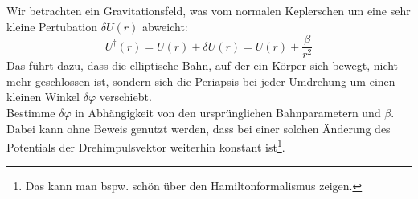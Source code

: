 \begin{Exercise}[label = phshift, title = Periheldrehung, difficulty = 5, origin = Aaron Wild]
	Wir betrachten ein Gravitationsfeld, was vom normalen Keplerschen um eine sehr kleine Pertubation $\delta U\left(r\right)$ abweicht:
	\begin{equation}\label{phshift:pot}
		U^\dagger\left(r\right) = U\left(r\right) + \delta U\left(r\right) = U\left(r\right)+\frac{\beta}{r^2}
	\end{equation}
	Das führt dazu, dass die elliptische Bahn, auf der ein Körper sich bewegt, nicht mehr geschlossen ist, sondern sich die Periapsis bei jeder Umdrehung um einen kleinen Winkel $\delta \varphi$ verschiebt. \\
	Bestimme $\delta \varphi$ in Abhängigkeit von den ursprünglichen Bahnparametern und $\beta$. \\
	Dabei kann ohne Beweis genutzt werden, dass bei einer solchen Änderung des Potentials der Drehimpulsvektor weiterhin konstant ist\footnote[2]{Das kann man bspw. schön über den Hamiltonformalismus zeigen.}.
	
\end{Exercise}
